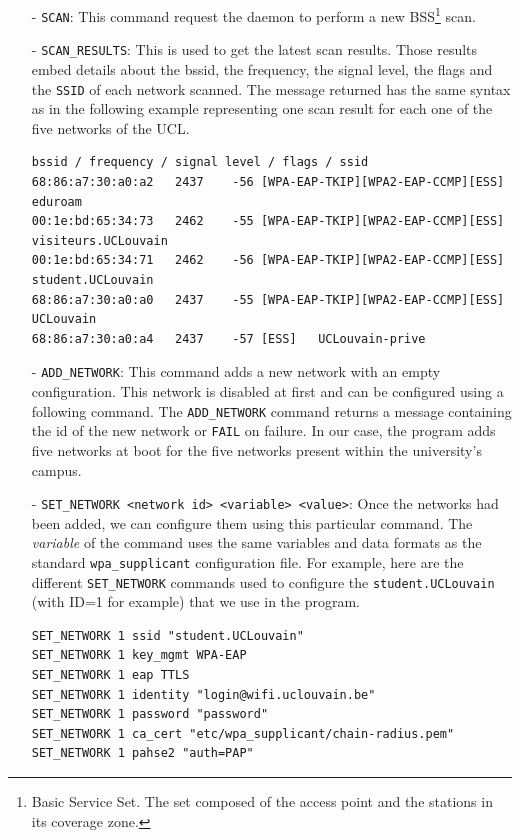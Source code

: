 \begin{itemize}
	\item[-] \texttt{SCAN}: This command request the daemon to perform a new BSS\footnote{Basic Service Set. The set composed of the access point and the stations in its coverage zone.} scan.

	\item[-] \texttt{SCAN\_RESULTS}: This is used to get the latest scan results. Those results embed details about the bssid, the frequency, the signal level, the flags and the \texttt{SSID} of each network scanned. The message returned has the same syntax as in the following example representing one scan result for each one of the five networks of the UCL.\\

\begin{lstlisting}[frame=single,breaklines=true,caption={Scan results message example}]
bssid / frequency / signal level / flags / ssid
68:86:a7:30:a0:a2	2437	-56	[WPA-EAP-TKIP][WPA2-EAP-CCMP][ESS]	eduroam
00:1e:bd:65:34:73	2462	-55	[WPA-EAP-TKIP][WPA2-EAP-CCMP][ESS]	visiteurs.UCLouvain
00:1e:bd:65:34:71 	2462	-56	[WPA-EAP-TKIP][WPA2-EAP-CCMP][ESS]	student.UCLouvain
68:86:a7:30:a0:a0 	2437	-55	[WPA-EAP-TKIP][WPA2-EAP-CCMP][ESS]	UCLouvain
68:86:a7:30:a0:a4 	2437	-57	[ESS]	UCLouvain-prive
\end{lstlisting}

	\item[-] \texttt{ADD\_NETWORK}: This command adds a new network with an empty configuration. This network is disabled at first and can be configured using a following command. The \texttt{ADD\_NETWORK} command returns a message containing the id of the new network or \texttt{FAIL} on failure. In our case, the program adds five networks at boot for the five networks present within the university's campus.

	\item[-] \texttt{SET\_NETWORK <network id> <variable> <value>}: Once the networks had been added, we can configure them using this particular command. The \textit{variable} of the command uses the same variables and data formats as the standard \texttt{wpa\_supplicant} configuration file. For example, here are the different \texttt{SET\_NETWORK} commands used to configure the \texttt{student.UCLouvain} (with ID=1 for example) that we use in the program.\\

\begin{lstlisting}[frame=single,breaklines=true,caption={Configuration of the \texttt{student.UCLouvain} network}]
SET_NETWORK 1 ssid "student.UCLouvain"
SET_NETWORK 1 key_mgmt WPA-EAP
SET_NETWORK 1 eap TTLS
SET_NETWORK 1 identity "login@wifi.uclouvain.be"
SET_NETWORK 1 password "password"
SET_NETWORK 1 ca_cert "etc/wpa_supplicant/chain-radius.pem"
SET_NETWORK 1 pahse2 "auth=PAP"
\end{lstlisting}


\end{itemize}
